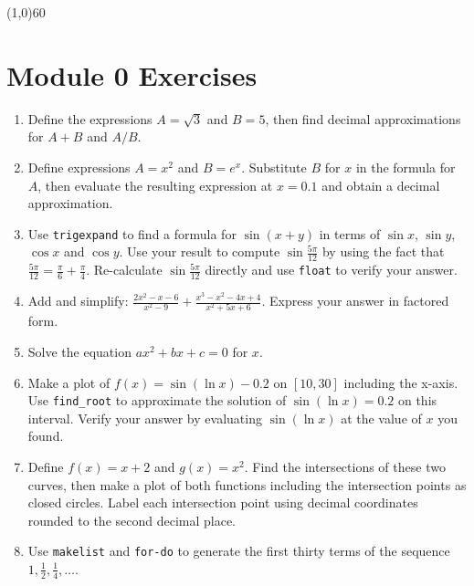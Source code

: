 \documentclass[10.5pt,twoside]{report}
\theoremstyle{definition}
\begin{document}
\line(1,0){60}
\linethickness{0.5mm}

\pagebreak






\section{Module 0 Exercises}\label{Module 0 Exercises}

\begin{enumerate}

\item  Define the expressions $A=\sqrt{3}$ and $B=5$, then find decimal approximations for $A+B$ and $A/B$.

\item  Define expressions $A=x^2$ and $B=e^x$.  Substitute $B$ for $x$ in the formula for $A$, then evaluate the resulting expression at $x=0.1$ and obtain a decimal approximation.

\item  Use \verb|trigexpand| to find a formula for $\sin{(x+y)}$ in terms of $\sin{x}$, $\sin{y}$, $\cos{x}$ and $\cos{y}$.  Use your result to compute $\sin{\frac{5\pi}{12}}$ by using the fact that $\frac{5\pi}{12}=\frac{\pi}{6}+\frac{\pi}{4}$.  Re-calculate $\sin{\frac{5\pi}{12}}$ directly and use \verb|float| to verify your answer.


\item  Add and simplify:  $\frac{2x^2-x-6}{x^2-9}+\frac{x^3-x^2-4x+4}{x^2+5x+6}$.  Express your answer in factored form.

\item Solve the equation $ax^2+bx+c=0$ for $x$.  


\item Make a plot of $f(x)=\sin{(\ln{x})}-0.2$ on $[10,30]$ including the x-axis.  Use \verb|find_root| to approximate the solution of $\sin{(\ln{x})}=0.2$ on this interval.  Verify your answer by evaluating $\sin{(\ln{x})}$ at the value of $x$ you found.

\item  Define $f(x)=x+2$ and $g(x)=x^2$.  Find the intersections of these two curves, then make a plot of both functions including the intersection points as closed circles.  Label each intersection point using decimal coordinates rounded to the second decimal place.

\item  Use \verb|makelist| and \verb|for-do| to generate the first thirty terms of the sequence $1,\frac{1}{2},\frac{1}{4},\dots$.


\end{enumerate}
\end{document}
